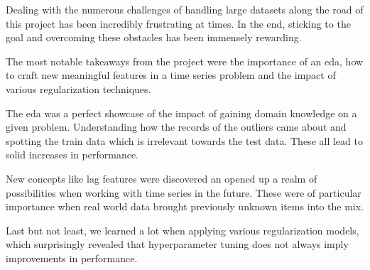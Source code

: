 Dealing with the numerous challenges of handling large datasets along the road of this project has been incredibly frustrating at times. In the end, sticking to the goal and overcoming these obstacles has been immensely rewarding.

The most notable takeaways from the project were the importance of an \acrshort{eda}, how to craft new meaningful features in a time series problem and the impact of various regularization techniques.

The \acrshort{eda} was a perfect showcase of the impact of gaining domain knowledge on a given problem. Understanding how the records of the outliers came about and spotting the train data which is irrelevant towards the test data. 
These all lead to solid increases in performance.

New concepts like lag features were discovered an opened up a realm of possibilities when working with time series in the future. These were of particular importance when real world data brought previously unknown items into the mix.

Last but not least, we learned a lot when applying various regularization models, which surprisingly revealed that \gls{hyperparameter} tuning does not always imply improvements in performance.
